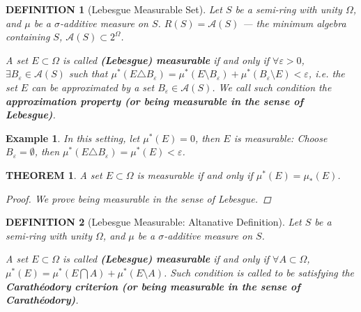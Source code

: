 \documentclass[12pt]{article}
\theoremstyle{blueplain}
\newtheorem{theorem}{THEOREM}[section]
\theoremstyle{bluedef}
\newtheorem{definition}{DEFINITION}[section]
\theoremstyle{blueremark}
\newtheorem{example}{Example}[section]
\newcommand{\eps}{\varepsilon}
\numberwithin{equation}{section}
\begin{document}
\begin{definition}[Lebesgue Measurable Set]

  Let $S$ be a semi-ring with unity $\Omega$, and $\mu$ be a $\sigma$-additive measure on $S$. $R(S) = \mathcal{A}(S)$ --- the minimum algebra containing $S$, $\mathcal{A}(S) \subset 2^\Omega$.

  A set $E \subset \Omega$ is called \textbf{(Lebesgue) measurable} if and only if $\forall \eps > 0$, $\exists B_{\eps} \in \mathcal{A}(S)$ such that $\mu^*(E \triangle B_{\eps}) = \mu^*(E \setminus B_{\eps}) + \mu^*(B_{\eps} \setminus E) < \eps$, i.e. the set $E$ can be approximated by a set $B_{\eps} \in \mathcal{A}(S)$. We call such condition the \textbf{approximation property (or being measurable in the sense of Lebesgue)}.
\end{definition}

\begin{example}
  In this setting, let $\mu^*(E) = 0$, then $E$ is measurable: Choose $B_{\eps} = \emptyset$, then \(\mu^*(E \triangle B_{\eps}) = \mu^*(E) < \eps\).
\end{example}

\begin{theorem}

  A set $E \subset \Omega$ is measurable if and only if $\mu^*(E) = \mu_*(E)$.

  \begin{proof}
    We prove being measurable in the sense of Lebesgue.


  \end{proof}











\end{theorem}

\begin{definition}[Lebesgue Measurable: Altanative Definition]

  Let $S$ be a semi-ring with unity $\Omega$, and $\mu$ be a $\sigma$-additive measure on $S$.

  A set $E \subset \Omega$ is called \textbf{(Lebesgue) measurable} if and only if $\forall A \subset \Omega$, $\mu^*(E) = \mu^*(E \bigcap A) + \mu^*(E \setminus A)$. Such condition is called to be satisfying the \textbf{Carathéodory criterion (or being measurable in the sense of Carathéodory)}.
\end{definition}
\end{document}
